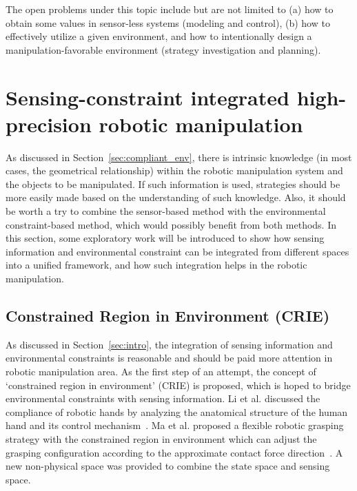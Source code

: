 \documentclass[journal,twoside,web]{ieeecolor}
\begin{document}
The open problems under this topic include but are not limited to (a) how to obtain some values in sensor-less systems (modeling and control), (b) how to effectively utilize a given environment, and how to intentionally design a manipulation-favorable environment (strategy investigation and planning).

\section{Sensing-constraint integrated high-precision robotic manipulation}
\label{sec:compliant_integration}

As discussed in Section~\ref{sec:compliant_env}, there is intrinsic knowledge (in most cases, the geometrical relationship) within the robotic manipulation system and the objects to be manipulated. 
If such information is used, strategies should be more easily made based on the understanding of such knowledge. 
Also, it should be worth a try to combine the sensor-based method with the environmental constraint-based method, which would possibly benefit from both methods. 
In this section, some exploratory work will be introduced to show how sensing information and environmental constraint can be integrated from different spaces into a unified framework, and how such integration helps in the robotic manipulation.


\subsection{Constrained Region in Environment (CRIE)}
\label{subsec:crie}

As discussed in Section~\ref{sec:intro}, the integration of sensing information and environmental constraints is reasonable and should be paid more attention in robotic manipulation area. 
As the first step of an attempt, the concept of `constrained region in environment' (CRIE) is proposed, which is hoped to bridge environmental constraints with sensing information. 
Li et al. discussed the compliance of robotic hands by analyzing the anatomical structure of the human hand and its control mechanism~\cite{Li2015}.
Ma et al. proposed a flexible robotic grasping strategy with the constrained region in environment which can adjust the grasping configuration according to the approximate contact force direction~\cite{Ma2017}. A new non-physical space was provided to combine the state space and sensing space.
\end{document}

